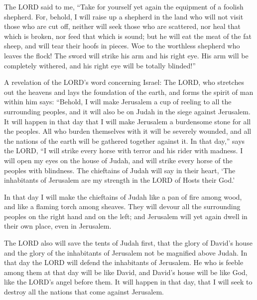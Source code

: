 \myverse{}The LORD said to me, “Take for yourself yet again the equipment
of a foolish shepherd.
\myverse{}For, behold, I will raise up a shepherd in the land who will not visit those
who are cut off, neither will seek those who are scattered, nor heal that which is broken, nor feed that
which is sound; but he will eat the meat of the fat sheep, and will tear their hoofs in pieces.
\myverse{}Woe to the worthless shepherd who leaves the flock! The sword will strike
his arm and his right eye. His arm will be completely withered, and his right eye will be totally blinded!”


\mychapter{} \myverse*{}A revelation of the LORD’s word concerning Israel: The LORD, who
stretches out the heavens and lays the foundation of the earth, and forms the spirit of man within him
says:
\myverse{}“Behold, I will make Jerusalem a cup of reeling to all the surrounding peoples,
and it will also be on Judah in the siege against Jerusalem.
\myverse{}It will happen in that day that I will make Jerusalem a burdensome stone for
all the peoples. All who burden themselves with it will be severely wounded, and all the nations of the
earth will be gathered together against it.
\myverse{}In that day,” says the LORD, “I will strike every horse with terror and his
rider with madness. I will open my eyes on the house of Judah, and will strike every horse of the peoples
with blindness.
\myverse{}The chieftains of Judah will say in their heart, ‘The inhabitants of Jerusalem
are my strength in the LORD of Hosts their God.’

\myverse{}In that day I will make the chieftains of Judah like a pan of
fire among wood, and like a flaming torch among sheaves. They will devour all the surrounding peoples
on the right hand and on the left; and Jerusalem will yet again dwell in their own place, even in Jerusalem.

\myverse{}The LORD also will save the tents of Judah first, that the glory
of David’s house and the glory of the inhabitants of Jerusalem not be magnified above Judah.
\myverse{}In that day the LORD will defend the inhabitants of Jerusalem. He who is feeble
among them at that day will be like David, and David’s house will be like God, like the LORD’s angel before
them.
\myverse{}It will happen in that day, that I will seek to destroy all the nations that
come against Jerusalem.

